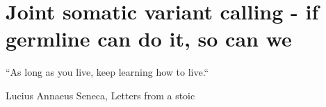 \chapter[Joint somatic variant calling]{Joint somatic variant calling - if germline can do it, so can we}
\label{ch:variantcalling}

\epigraph{``As long as you live, keep learning how to live.``}{\textup{Lucius Annaeus Seneca}, Letters from a stoic}









